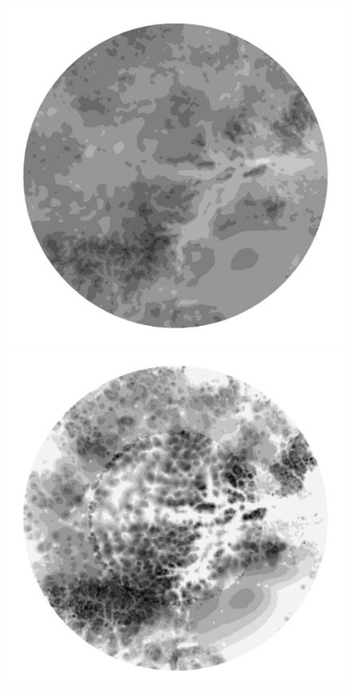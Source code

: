 \begin{figure}
  \centering
  
  \begin{minipage}[b]{0.30\linewidth}
    \includegraphics[width=1.0\textwidth]{images/EISMINT_II/Ubar/S_500.jpg}
  \end{minipage}
  \quad
  \begin{minipage}[b]{0.30\linewidth}
    \includegraphics[width=1.0\textwidth]{images/EISMINT_II/Ubar/beta_500.jpg}

\end{minipage}
\end{figure}
